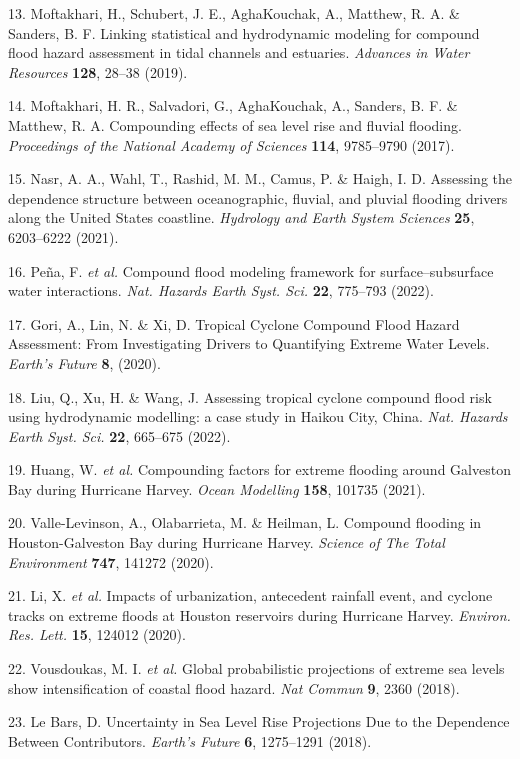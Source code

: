 \documentclass[
]{article}
\begin{document}
13. Moftakhari, H., Schubert, J. E., AghaKouchak, A., Matthew, R. A. \&
Sanders, B. F. Linking statistical and hydrodynamic modeling for
compound flood hazard assessment in tidal channels and estuaries.
\emph{Advances in Water Resources} \textbf{128}, 28--38 (2019).

14. Moftakhari, H. R., Salvadori, G., AghaKouchak, A., Sanders, B. F. \&
Matthew, R. A. Compounding effects of sea level rise and fluvial
flooding. \emph{Proceedings of the National Academy of Sciences}
\textbf{114}, 9785--9790 (2017).

15. Nasr, A. A., Wahl, T., Rashid, M. M., Camus, P. \& Haigh, I. D.
Assessing the dependence structure between oceanographic, fluvial, and
pluvial flooding drivers along the United States coastline.
\emph{Hydrology and Earth System Sciences} \textbf{25}, 6203--6222
(2021).

16. Peña, F. \emph{et al.} Compound flood modeling framework for
surface--subsurface water interactions. \emph{Nat. Hazards Earth Syst.
Sci.} \textbf{22}, 775--793 (2022).

17. Gori, A., Lin, N. \& Xi, D. Tropical Cyclone Compound Flood Hazard
Assessment: From Investigating Drivers to Quantifying Extreme Water
Levels. \emph{Earth's Future} \textbf{8}, (2020).

18. Liu, Q., Xu, H. \& Wang, J. Assessing tropical cyclone compound
flood risk using hydrodynamic modelling: a case study in Haikou City,
China. \emph{Nat. Hazards Earth Syst. Sci.} \textbf{22}, 665--675
(2022).

19. Huang, W. \emph{et al.} Compounding factors for extreme flooding
around Galveston Bay during Hurricane Harvey. \emph{Ocean Modelling}
\textbf{158}, 101735 (2021).

20. Valle-Levinson, A., Olabarrieta, M. \& Heilman, L. Compound flooding
in Houston-Galveston Bay during Hurricane Harvey. \emph{Science of The
Total Environment} \textbf{747}, 141272 (2020).

21. Li, X. \emph{et al.} Impacts of urbanization, antecedent rainfall
event, and cyclone tracks on extreme floods at Houston reservoirs during
Hurricane Harvey. \emph{Environ. Res. Lett.} \textbf{15}, 124012 (2020).

22. Vousdoukas, M. I. \emph{et al.} Global probabilistic projections of
extreme sea levels show intensification of coastal flood hazard.
\emph{Nat Commun} \textbf{9}, 2360 (2018).

23. Le Bars, D. Uncertainty in Sea Level Rise Projections Due to the
Dependence Between Contributors. \emph{Earth's Future} \textbf{6},
1275--1291 (2018).
\end{document}

